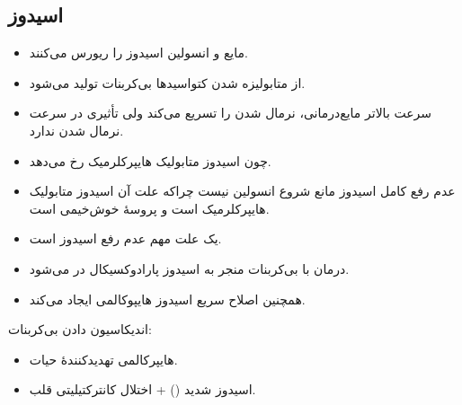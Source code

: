 \documentclass[12pt,a4paper]{article}
\begin{document}
\subsection*{اسیدوز}
\begin{itemize}
\item مایع و انسولین اسیدوز را ریورس می‌کنند.
\item از متابولیزه شدن کتواسیدها بی‌کربنات تولید می‌شود.
\item سرعت بالاتر مایع‌درمانی، نرمال شدن  را تسریع می‌کند ولی تأثیری در سرعت نرمال شدن  ندارد.
\item چون اسیدوز متابولیک هایپرکلرمیک رخ می‌دهد.
\item عدم رفع کامل اسیدوز مانع شروع انسولین  نیست چراکه علت آن اسیدوز متابولیک هایپرکلرمیک است و پروسهٔ خوش‌خیمی است.
\item {} یک علت مهم عدم رفع اسیدوز است.
\item درمان با بی‌کربنات منجر به اسیدوز پارادوکسیکال در  می‌شود.
\item همچنین اصلاح سریع اسیدوز هایپوکالمی ایجاد می‌کند.
\end{itemize}
اندیکاسیون دادن بی‌کربنات:
\begin{itemize}
\item هایپرکالمی تهدیدکنندهٔ حیات.
\item اسیدوز شدید () + اختلال کانترکتیلیتی قلب.
\end{itemize}

\end{document}
